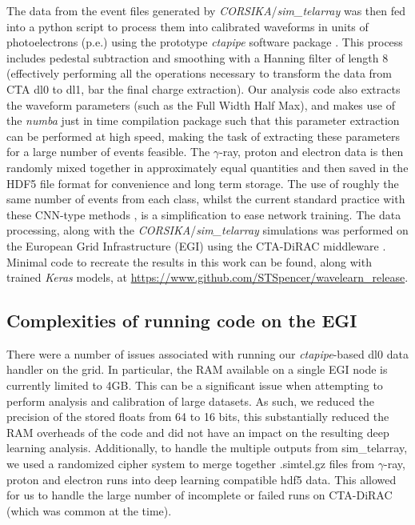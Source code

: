 The data from the event files generated by \textit{CORSIKA}/\textit{sim\_telarray} was then fed into a python script to process them into calibrated waveforms in units of photoelectrons (p.e.) using the prototype \textit{ctapipe} software package \cite{ctapipe} \cite{ctapipe2}. This process includes pedestal subtraction and smoothing with a Hanning filter \cite{hanning} of length 8 (effectively performing all the operations necessary to transform the data from CTA dl0 to dl1, bar the final charge extraction). Our analysis code also extracts the waveform parameters (such as the Full Width Half Max), and makes use of the \textit{numba} \cite{numba} just in time compilation package such that this parameter extraction can be performed at high speed, making the task of extracting these parameters for a large number of events feasible. The $\gamma$-ray, proton and electron data is then randomly mixed together in approximately equal quantities and then saved in the HDF5 \cite{hdf} file format for convenience and long term storage. The use of roughly the same number of events from each class, whilst the current standard practice with these CNN-type methods \cite{Shilon}, is a simplification to ease network training. The data processing, along with the \textit{CORSIKA}/\textit{sim\_telarray} simulations was performed on the European Grid Infrastructure (EGI) using the CTA-DiRAC middleware \cite{luisa}. Minimal code to recreate the results in this work can be found, along with trained \textit{Keras} models, at \url{https://www.github.com/STSpencer/wavelearn\_release}.

\subsection{Complexities of running code on the EGI}
There were a number of issues associated with running our \textit{ctapipe}-based dl0 data handler on the grid. In particular, the RAM available on a single EGI node is currently limited to 4GB. This can be a significant issue when attempting to perform analysis and calibration of large datasets. As such, we reduced the precision of the stored floats from 64 to 16 bits, this substantially reduced the RAM overheads of the code and did not have an impact on the resulting deep learning analysis. Additionally, to handle the multiple outputs from sim\_telarray, we used a randomized cipher system to merge together .simtel.gz files from $\gamma$-ray, proton and electron runs into deep learning compatible hdf5 data. This allowed for us to handle the large number of incomplete or failed runs on CTA-DiRAC (which was common at the time).


